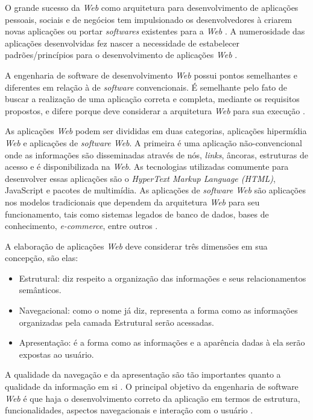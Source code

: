 O grande sucesso da \textit{Web} como arquitetura para desenvolvimento de aplicações pessoais, sociais e de negócios tem impulsionado os desenvolvedores à criarem novas aplicações ou portar \textit{softwares} existentes para a \textit{Web} \cite{fraternali1998conceptual}. A numerosidade das aplicações desenvolvidas fez nascer a necessidade de estabelecer padrões/princípios para o desenvolvimento de aplicações \textit{Web} \cite{pressman2000tangled}.
   
A engenharia de software de desenvolvimento \textit{Web} possui pontos semelhantes e diferentes em relação à de \textit{software} convencionais. É semelhante pelo fato de buscar a realização de uma aplicação correta e completa, mediante os requisitos propostos, e difere porque deve considerar a arquitetura \textit{Web} para sua execução \cite{conte2005processos}.

As aplicações \textit{Web} podem ser divididas em duas categorias, aplicações hipermídia \textit{Web} e aplicações de \textit{software Web}. A primeira é uma aplicação não-convencional onde as informações são disseminadas através de nós, \textit{links}, âncoras, estruturas de acesso e é disponibilizada na \textit{Web}. As tecnologias utilizadas comumente para desenvolver essas aplicações são o \textit{HyperText Markup Language (HTML)}, JavaScript e pacotes de multimídia. As aplicações de \textit{software Web} são aplicações nos modelos tradicionais que dependem da arquitetura \textit{Web} para seu funcionamento, tais como sistemas legados de banco de dados, bases de conhecimento, \textit{e-commerce}, entre outros \cite{mendes2005investigating}.

A elaboração de aplicações \textit{Web} deve considerar três dimensões em sua concepção, são elas:

\begin{itemize}
	\item Estrutural: diz respeito a organização das informações e seus relacionamentos semânticos.
	\item Navegacional: como o nome já diz, representa a forma como as informações organizadas pela camada Estrutural serão acessadas.
	\item Apresentação: é a forma como as informações e a aparência dadas à ela serão expostas ao usuário.
\end{itemize}

A qualidade da navegação e da apresentação são tão importantes quanto a qualidade da informação em si \cite{fraternali1998conceptual}. O principal objetivo da engenharia de software \textit{Web} é que haja o desenvolvimento correto da aplicação em termos de estrutura, funcionalidades, aspectos navegacionais e interação com o usuário \cite{pastor2004fitting}.

